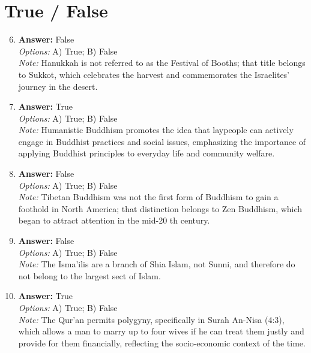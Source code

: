 \documentclass[12pt]{article}
\begin{document}
\section*{True / False}
\begin{enumerate}[label=\arabic*.]
\setcounter{enumi}{5}
\item \textbf{Answer:} False
\\ \textit{Options:} A) True; B) False
\\ \textit{Note:} Hanukkah is not referred to as the Festival of Booths; that title belongs to Sukkot, which celebrates the harvest and commemorates the Israelites' journey in the desert.
\item \textbf{Answer:} True
\\ \textit{Options:} A) True; B) False
\\ \textit{Note:} Humanistic Buddhism promotes the idea that laypeople can actively engage in Buddhist practices and social issues, emphasizing the importance of applying Buddhist principles to everyday life and community welfare.
\item \textbf{Answer:} False
\\ \textit{Options:} A) True; B) False
\\ \textit{Note:} Tibetan Buddhism was not the first form of Buddhism to gain a foothold in North America; that distinction belongs to Zen Buddhism, which began to attract attention in the mid-20 th century.
\item \textbf{Answer:} False
\\ \textit{Options:} A) True; B) False
\\ \textit{Note:} The Isma'ilis are a branch of Shia Islam, not Sunni, and therefore do not belong to the largest sect of Islam.
\item \textbf{Answer:} True
\\ \textit{Options:} A) True; B) False
\\ \textit{Note:} The Qur'an permits polygyny, specifically in Surah An-Nisa (4:3), which allows a man to marry up to four wives if he can treat them justly and provide for them financially, reflecting the socio-economic context of the time.
\end{enumerate}
\end{document}

